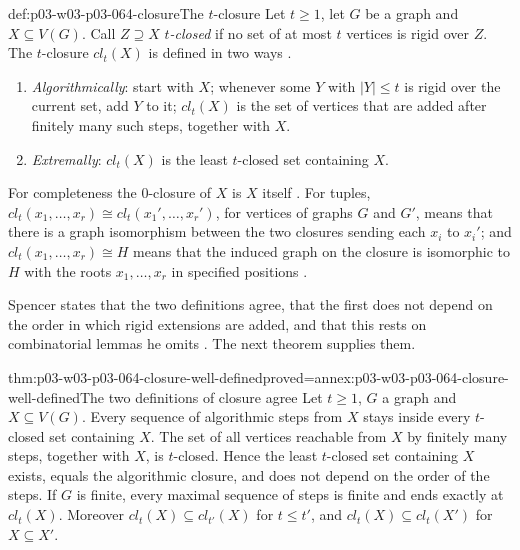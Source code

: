 \begin{hbdefinition}{def:p03-w03-p03-064-closure}{The \(t\)-closure}
Let \(t\geq1\), let \(G\) be a graph and \(X\subseteq V(G)\).  Call
\(Z\supseteq X\) \emph{\(t\)-closed} if no set of at most \(t\) vertices is
rigid over \(Z\).  The \(t\)-closure \(cl_t(X)\) is defined in two ways
\cite[p.~8]{Spencer2007LogicRandomStructuresAuthor}.
\begin{enumerate}
\item \emph{Algorithmically}: start with \(X\); whenever some \(Y\) with
  \(|Y|\leq t\) is rigid over the current set, add \(Y\) to it; \(cl_t(X)\)
  is the set of vertices that are added after finitely many such steps,
  together with \(X\).
\item \emph{Extremally}: \(cl_t(X)\) is the least \(t\)-closed set
  containing \(X\).
\end{enumerate}
For completeness the \(0\)-closure of \(X\) is \(X\) itself
\cite[p.~9]{Spencer2007LogicRandomStructuresAuthor}.  For tuples,
\(cl_t(x_1,\ldots,x_r)\cong cl_t(x_1',\ldots,x_r')\), for vertices of graphs
\(G\) and \(G'\), means that there is a graph isomorphism between the two
closures sending each \(x_i\) to \(x_i'\); and \(cl_t(x_1,\ldots,x_r)\cong H\)
means that the induced graph on the closure is isomorphic to \(H\) with the
roots \(x_1,\ldots,x_r\) in specified positions
\cite[pp.~8--9]{Spencer2007LogicRandomStructuresAuthor}.
\end{hbdefinition}

Spencer states that the two definitions agree, that the first does not
depend on the order in which rigid extensions are added, and that this rests
on combinatorial lemmas he omits
\cite[p.~8]{Spencer2007LogicRandomStructuresAuthor}.  The next theorem
supplies them.

\begin{hbtheorem}{thm:p03-w03-p03-064-closure-well-defined}{proved=annex:p03-w03-p03-064-closure-well-defined}{The two definitions of closure agree}
Let \(t\geq1\), \(G\) a graph and \(X\subseteq V(G)\).  Every sequence of
algorithmic steps from \(X\) stays inside every \(t\)-closed set containing
\(X\).  The set of all vertices reachable from \(X\) by finitely many steps,
together with \(X\), is \(t\)-closed.  Hence the least \(t\)-closed set
containing \(X\) exists, equals the algorithmic closure, and does not depend
on the order of the steps.  If \(G\) is finite, every maximal sequence of
steps is finite and ends exactly at \(cl_t(X)\).  Moreover
\(cl_t(X)\subseteq cl_{t'}(X)\) for \(t\leq t'\), and
\(cl_t(X)\subseteq cl_t(X')\) for \(X\subseteq X'\).
\end{hbtheorem}

